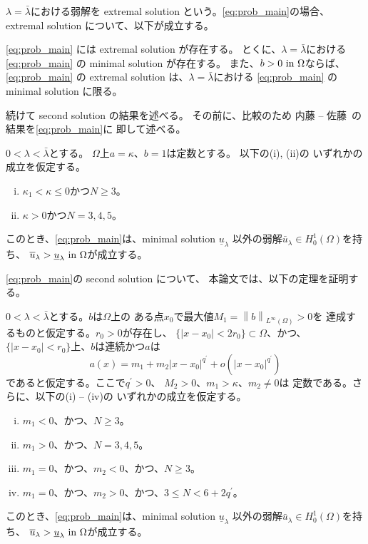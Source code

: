 $\lambda = \bar{\lambda}$における弱解を
extremal solution という。\ref{eq:prob_main}の場合、
extremal solution について、以下が成立する。

\begin{thm} \label{thm:extremal_solution}
 \ref{eq:prob_main} には extremal solution が存在する。
 とくに、$\lambda = \bar{\lambda}$における
 \ref{eq:prob_main} の
 minimal solution が存在する。
 また、$b > 0 ~\text{in}~ \Omega$ならば、\ref{eq:prob_main} の 
 extremal solution は、$\lambda = \bar{\lambda}$における
 \ref{eq:prob_main} の
 minimal solution に限る。
\end{thm}

続けて second solution の結果を述べる。
その前に、比較のため
内藤 -- 佐藤~\cite{MR2886160}の結果を\ref{eq:prob_main}に
即して述べる。

\begin{thm}
 \label{thm:second_solution_naito_sato}
 $0 < \lambda < \bar{\lambda}$とする。
 $\Omega$上$a = \kappa$、$b = 1$は定数とする。
 以下の(i), (ii)の
 いずれかの成立を仮定する。
 \begin{enumerate}[(i)]
  \item $\kappa_1 < \kappa \leq 0$かつ$N \geq 3$。
  \item $\kappa > 0$かつ$N = 3, 4, 5$。
 \end{enumerate}
 このとき、\ref{eq:prob_main}は、minimal solution
 $\underline{u}_\lambda$
 以外の弱解$\bar{u}_\lambda \in H_0^1(\Omega)$を持ち、
 $\overline{u}_\lambda >
 \underline{u}_\lambda ~\text{in}~ \Omega$が成立する。
\end{thm}

\ref{eq:prob_main}の second solution について、
本論文では、以下の定理を証明する。

\begin{thm} \label{thm:second_solution}
 $0 < \lambda < \bar{\lambda}$とする。$b$は$\Omega$上の
 ある点$x_0$で最大値$M_1 = \left\| b \right\|_{L^\infty(\Omega)} > 0$を
 達成するものと仮定する。$r_0 > 0$が存在し、
 $\{ \lvert x - x_0 \rvert < 2r_0 \} \subset \Omega$、かつ、
 $\{ \lvert x - x_0 \rvert < r_0 \}$上、$b$は連続かつ$a$は
 \begin{equation}
  a(x) = m_1 + m_2 \lvert x-x_0 \rvert^{q^\prime} 
  + o(\lvert x-x_0 \rvert^{q^\prime}) \label{eq:a_q}
 \end{equation}
 であると仮定する。ここで$q^\prime > 0$、
 $M_2 > 0$、$m_1 > \kappa$、$m_2 \neq 0$は
 定数である。さらに、以下の(i) -- (iv)の
 いずれかの成立を仮定する。
 \begin{enumerate}[(i)]
  \item $m_1 < 0$、かつ、$N \geq 3$。
  \item $m_1 > 0$、かつ、$N = 3, 4, 5$。
  \item $m_1 = 0$、かつ、$m_2 < 0$、かつ、$N \geq 3$。
  \item $m_1 = 0$、かつ、$m_2 > 0$、かつ、$3 \leq N < 6 + 2q^\prime$。
 \end{enumerate}
 このとき、\ref{eq:prob_main}は、minimal solution
 $\underline{u}_\lambda$
 以外の弱解$\bar{u}_\lambda \in H_0^1(\Omega)$を持ち、
 $\overline{u}_\lambda >
 \underline{u}_\lambda ~\text{in}~ \Omega$が成立する。
\end{thm}


